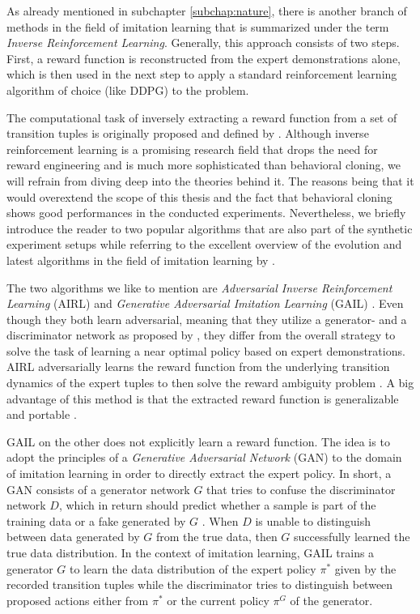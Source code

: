 As already mentioned in subchapter \ref{subchap:nature}, there is another branch of methods in the field of imitation learning that is summarized under the term \textit{Inverse Reinforcement Learning}. Generally, this approach consists of two steps. First, a reward function is reconstructed from the expert demonstrations alone, which is then used in the next step to apply a standard reinforcement learning algorithm of choice (like DDPG) to the problem.
\par
The computational task of inversely extracting a reward function from a set of transition tuples is originally proposed and defined by \cite{russell1998learning}. Although inverse reinforcement learning is a promising research field that drops the need for reward engineering and is much more sophisticated than behavioral cloning, we will refrain from diving deep into the theories behind it. The reasons being that it would overextend the scope of this thesis and the fact that behavioral cloning shows good performances in the conducted experiments. Nevertheless, we briefly introduce the reader to two popular algorithms that are also part of the synthetic experiment setups while referring to the excellent overview of the evolution and latest algorithms in the field of imitation learning by \cite{zheng2021imitation}.
\par
The two algorithms we like to mention are  \textit{Adversarial Inverse Reinforcement Learning} (AIRL) \cite[]{fu2017learning} and \textit{Generative Adversarial Imitation Learning} (GAIL) \cite[]{ho2016generative}. Even though they both learn adversarial, meaning that they utilize a generator- and a discriminator network as proposed by \cite{goodfellow2014generative}, they differ from the overall strategy to solve the task of learning a near optimal policy based on expert demonstrations. AIRL adversarially learns the 
reward function from the underlying transition dynamics of the expert tuples to then solve the reward ambiguity problem \cite[pp.~4-5]{fu2017learning}. A big advantage of this method is that the extracted reward function is generalizable and portable \cite[p.~1735]{wang2020deep}.
\par
GAIL on the other does not explicitly learn a reward function. The idea is to adopt the principles of a \textit{Generative Adversarial Network} (GAN) to the domain of imitation learning in order to directly extract the expert policy. In short, a GAN consists of a generator network $G$ that tries to confuse the discriminator network $D$, which in return should predict whether a sample is part of the training data or a fake generated by $G$ \cite[p.~1]{goodfellow2014generative}. When $D$ is unable to distinguish between data generated by $G$ from the true data, then $G$ successfully learned the true data distribution. In the context of imitation learning, GAIL trains a generator $G$ to learn the data distribution of the expert policy $\pi^*$ given by the recorded transition tuples while the discriminator tries to distinguish between proposed actions either from $\pi^*$ or the current policy $\pi^G$ of the generator.
